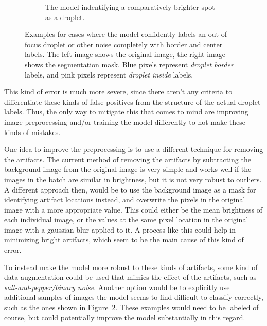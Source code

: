 \begin{figure}[htbp]
\begin{subfigure}{\textwidth}
{\begin{tabular}{ll}
            \end{tabular}
        }
        \caption{The model indentifying a comparatively brighter spot as a droplet.}
        \label{fig:totally_wrong_b}
    \end{subfigure}
    \vspace{0.2cm}
    \caption{Examples for cases where the model confidently labels an out of focus droplet or other noise completely with border and center labels. The left image shows the original image, the right image shows the segmentation mask. Blue pixels represent \emph{droplet border} labels, and pink pixels represent \emph{droplet inside} labels.}
    \label{fig:totally_wrong}
\end{figure}

This kind of error is much more severe, since there aren't any criteria to differentiate these kinds of false positives from the structure of the actual droplet labels.
Thus, the only way to mitigate this that comes to mind are improving image preprocessing and/or training the model differently to not make these kinds of mistakes.

One idea to improve the preprocessing is to use a different technique for removing the artifacts. 
The current method of removing the artifacts by subtracting the background image from the original image is very simple and works well if the images in the batch are similar in brightness, but it is not very robust to outliers.
A different approach then, would be to use the background image as a mask for identifying artifact locations instead, and overwrite the pixels in the original image with a more appropriate value. 
This could either be the mean brightness of each individual image, or the values at the same pixel location in the original image with a gaussian blur applied to it.
A process like this could help in minimizing bright artifacts, which seem to be the main cause of this kind of error.

To instead make the model more robust to these kinds of artifacts, some kind of data augmentation could be used that mimics the effect of the artifacts, such as \emph{salt-and-pepper/binary noise}. Another option would be to explicitly use additional samples of images the model seems to find difficult to classify correctly, such as the ones shown in Figure~\ref{fig:totally_wrong}. These examples would need to be labeled of course, but could potentially improve the model substantially in this regard.

